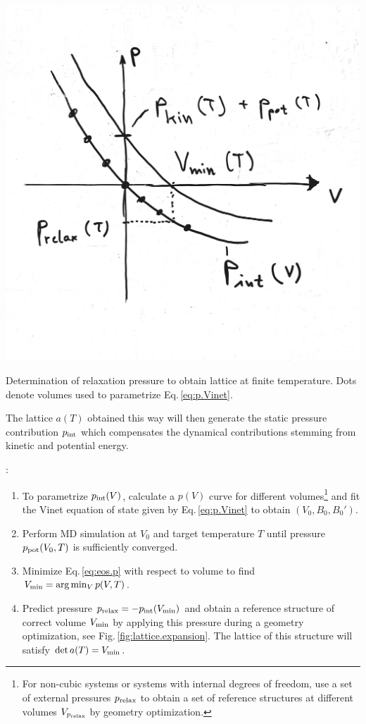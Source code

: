 \begin{marginfigure}
	\includegraphics[width=\textwidth]{./data/sketches/lattice_expansion.jpg}
	\caption{Determination of relaxation pressure to obtain lattice at finite temperature. Dots denote volumes used to parametrize Eq.\,\eqref{eq:p.Vinet}.}
	\label{fig:lattice.expansion}
\end{marginfigure}
The lattice $a (T)$ obtained this way will then generate the static pressure contribution $p_{\rm int}$ which compensates the dynamical contributions stemming from kinetic and potential energy.

:
\begin{enumerate}
	\item To parametrize $p_{\rm int} (V)$, calculate a $p(V)$ curve for different volumes\footnote{For non-cubic systems or systems with internal degrees of freedom, use a set of external pressures $p_{\rm relax}$ to obtain a set of reference structures at different volumes $V_{p_{\rm relax}}$ by geometry optimization.} and fit the Vinet equation of state given by Eq.\,\eqref{eq:p.Vinet} to obtain $(V_0, B_0, B_0')$.
	\item Perform MD simulation at $V_0$ and target temperature $T$ until pressure $p_{\rm pot} (V_0, T)$ is sufficiently  converged.
	\item Minimize Eq.\,\eqref{eq:eos.p} with respect to volume to find $V_{\rm min} = \arg \min_V p (V, T)$.
	\item Predict pressure $p_{\rm relax} = - p_{\rm int} (V_{\rm min})$ and obtain a reference structure of correct volume $V_{\rm min}$ by applying this pressure during a geometry optimization, see Fig.\,\ref{fig:lattice.expansion}. The lattice of this structure will satisfy $\det a(T) = V_{\rm min}$.
\end{enumerate}

